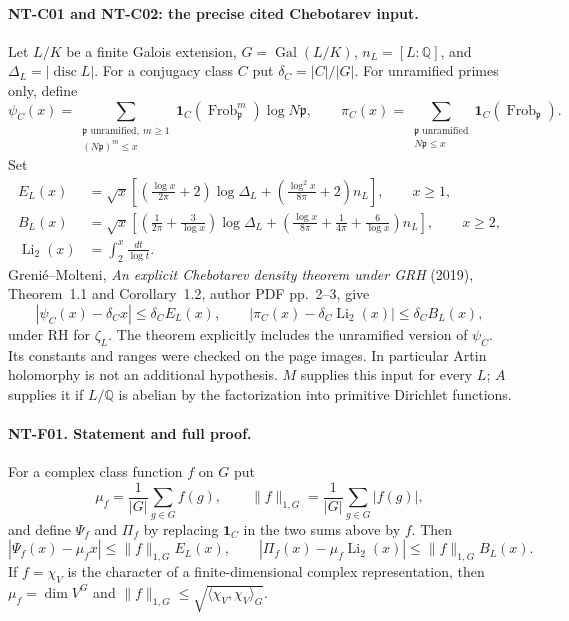 \documentclass[11pt,a4paper]{article}
\begin{document}
\paragraph{NT-C01 and NT-C02: the precise cited Chebotarev input.}
Let $L/K$ be a finite Galois extension, $G=\operatorname{Gal}(L/K)$,
$n_L=[L:\mathbb Q]$, and $\Delta_L=|\operatorname{disc}L|$.
For a conjugacy class $C$ put $\delta_C=|C|/|G|$.  For unramified
primes only, define
\[
 \psi_C(x)=\sum_{\substack{\mathfrak p\text{ unramified},\ m\ge1\\
                    (N\mathfrak p)^m\le x}}
 \mathbf1_C(\operatorname{Frob}_{\mathfrak p}^{m})\log N\mathfrak p,
 \qquad
 \pi_C(x)=\sum_{\substack{\mathfrak p\text{ unramified}\\N\mathfrak p\le x}}
             \mathbf1_C(\operatorname{Frob}_{\mathfrak p}).
\]
Set
\begin{align*}
 E_L(x)&=\sqrt{x}\left[
       \left(\frac{\log x}{2\pi}+2\right)\log\Delta_L+
       \left(\frac{\log^2x}{8\pi}+2\right)n_L\right],\qquad x\ge1,\\
 B_L(x)&=\sqrt{x}\left[
       \left(\frac1{2\pi}+\frac3{\log x}\right)\log\Delta_L+
       \left(\frac{\log x}{8\pi}+\frac1{4\pi}+\frac6{\log x}\right)n_L
                         \right],\qquad x\ge2,\\
 \operatorname{Li}_2(x)&=\int_2^x\frac{dt}{\log t}.
\end{align*}
Greni\'e--Molteni, \emph{An explicit Chebotarev density theorem under GRH}
(2019), Theorem~1.1 and Corollary~1.2, author PDF pp.~2--3, give
\[
 |\psi_C(x)-\delta_Cx|\le\delta_C E_L(x),\qquad
 |\pi_C(x)-\delta_C\operatorname{Li}_2(x)|\le\delta_C B_L(x),
\tag{NT-C}
\]
under RH for $\zeta_L$.  The theorem explicitly includes the unramified
version of $\psi_C$.  Its constants and ranges were checked on the page
images.  In particular Artin holomorphy is not an additional hypothesis.
$M$ supplies this input for every $L$; $A$ supplies it if $L/\mathbb Q$
is abelian by the factorization into primitive Dirichlet functions.

\paragraph{NT-F01. Statement and full proof.}
For a complex class function $f$ on $G$ put
\[
 \mu_f=\frac1{|G|}\sum_{g\in G}f(g),\qquad
 \|f\|_{1,G}=\frac1{|G|}\sum_{g\in G}|f(g)|,
\]
and define $\Psi_f$ and $\Pi_f$ by replacing $\mathbf1_C$ in the two
sums above by $f$.  Then
\[
 |\Psi_f(x)-\mu_fx|\le\|f\|_{1,G}E_L(x),\qquad
 |\Pi_f(x)-\mu_f\operatorname{Li}_2(x)|\le\|f\|_{1,G}B_L(x).
\tag{NT-F01}
\]
If $f=\chi_V$ is the character of a finite-dimensional complex
representation, then $\mu_f=\dim V^G$ and
$\|f\|_{1,G}\le\sqrt{\langle\chi_V,\chi_V\rangle_G}$.
\end{document}
